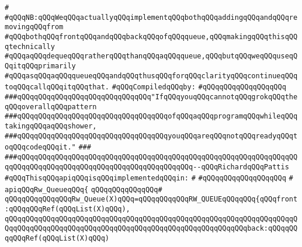 \verb|#|\newline
\verb|#qQQqNB:qQQqWeqQQqactuallyqQQqimplementqQQqbothqQQqaddingqQQqandqQQqremovingqQQqfrom|\newline
\verb|#qQQqbothqQQqfrontqQQqandqQQqbackqQQqofqQQqqueue,qQQqmakingqQQqthisqQQqtechnically|\newline
\verb|#qQQqaqQQqdequeqQQqratherqQQqthanqQQqaqQQqqueue,qQQqbutqQQqweqQQquseqQQqitqQQqprimarily|\newline
\verb|#qQQqasqQQqaqQQqqueueqQQqandqQQqthusqQQqforqQQqclarityqQQqcontinueqQQqtoqQQqcallqQQqitqQQqthat.|\newline
\newline
\verb|#qQQqCompiledqQQqby:|\newline
\verb|#qQQqqQQqqQQqqQQqqQQq|\newline
\newline
\newline
\verb|###qQQqqQQqqQQqqQQqqQQqqQQqqQQqqQQq"IfqQQqyouqQQqcannotqQQqgrokqQQqtheqQQqoverallqQQqpattern|\newline
\verb|###qQQqqQQqqQQqqQQqqQQqqQQqqQQqqQQqqQQqofqQQqaqQQqprogramqQQqwhileqQQqtakingqQQqaqQQqshower,|\newline
\verb|###qQQqqQQqqQQqqQQqqQQqqQQqqQQqqQQqqQQqyouqQQqareqQQqnotqQQqreadyqQQqtoqQQqcodeqQQqit."|\newline
\verb|###|\newline
\verb|###qQQqqQQqqQQqqQQqqQQqqQQqqQQqqQQqqQQqqQQqqQQqqQQqqQQqqQQqqQQqqQQqqQQqqQQqqQQqqQQqqQQqqQQqqQQqqQQqqQQqqQQqqQQqqQQq--qQQqRichardqQQqPattis|\newline
\newline
\newline
\newline
\newline
\verb|#qQQqThisqQQqapiqQQqisqQQqimplementedqQQqin:|\newline
\verb|#|\newline
\verb|#qQQqqQQqqQQqqQQqqQQq|\newline
\verb|#|\newline
\verb|apiqQQqRw_QueueqQQq{|\newline
\verb|qQQqqQQqqQQqqQQq#|\newline
\verb|qQQqqQQqqQQqqQQqRw_Queue(X)qQQq=qQQqqQQqqQQqRW_QUEUEqQQqqQQq{qQQqfront:qQQqqQQqRef(qQQqList(X)qQQq),|\newline
\verb|qQQqqQQqqQQqqQQqqQQqqQQqqQQqqQQqqQQqqQQqqQQqqQQqqQQqqQQqqQQqqQQqqQQqqQQqqQQqqQQqqQQqqQQqqQQqqQQqqQQqqQQqqQQqqQQqqQQqqQQqqQQqqQQqback:qQQqqQQqqQQqRef(qQQqList(X)qQQq)|\newline
